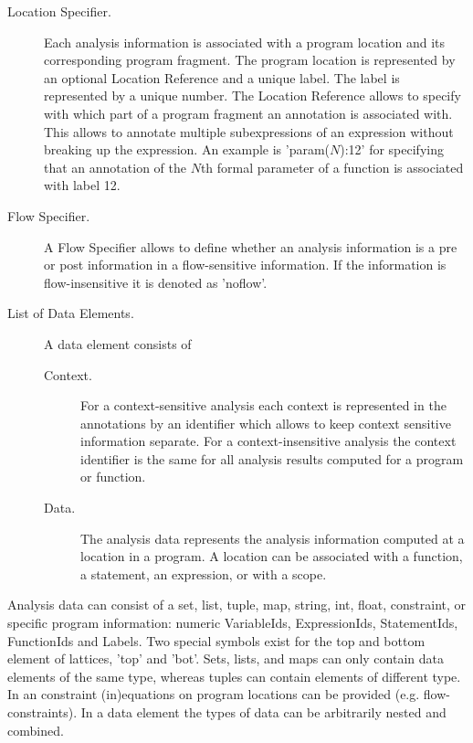 \begin{description}
\begin{description}
\begin{description}
\item [Location Specifier.] Each analysis information is associated with a
program location and its corresponding program fragment. The program
location is represented by an optional Location Reference and a unique
label. The label is represented by a unique number.
The Location Reference allows to specify with which
part of a program fragment an annotation is associated with. This allows to
annotate multiple subexpressions of an expression without breaking up
the expression. An example is 'param($N$):12' for specifying that an annotation
of the $N$th formal parameter of a function is associated with label 12.

\item [Flow Specifier.] A Flow Specifier allows to define whether an analysis information is a pre or post information in a flow-sensitive information. If the information is flow-insensitive it is denoted as 'noflow'.
\item [List of Data Elements.] A data element consists of
\begin{description}
\item [Context.] For a context-sensitive analysis each context is represented in the annotations by an identifier which allows to keep context sensitive information separate. For a context-insensitive analysis the context identifier is the same for all analysis results computed for a program or function.
\item [Data.] The analysis data represents the analysis
information computed at a location in a program. A location can be
associated with a function, a statement, an expression, or with a scope.
\end{description}
\end{description}
\end{description}

Analysis data can consist of a set, list, tuple, map, string, int, float,
constraint, or specific program information: numeric VariableIds,
ExpressionIds, StatementIds, FunctionIds and Labels. Two special
symbols exist for the top and bottom element of lattices, 'top' and 'bot'. Sets, lists,
and maps can only contain data elements of the same type, whereas
tuples can contain elements of different type. In an constraint
(in)equations on program locations can be provided
(e.g. flow-constraints). In a data element the types of data can be
arbitrarily nested and combined.
\end{description}

